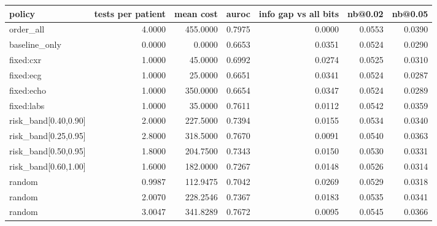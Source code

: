 \begin{tabular}{lrrrrrr}
\toprule
\textbf{policy} & \textbf{tests per patient} & \textbf{mean cost} & \textbf{auroc} & \textbf{info gap vs all bits} & \textbf{nb@0.02} & \textbf{nb@0.05} \\
\midrule
order\_all & 4.0000 & 455.0000 & 0.7975 & 0.0000 & 0.0553 & 0.0390 \\
baseline\_only & 0.0000 & 0.0000 & 0.6653 & 0.0351 & 0.0524 & 0.0290 \\
fixed:cxr & 1.0000 & 45.0000 & 0.6992 & 0.0274 & 0.0525 & 0.0310 \\
fixed:ecg & 1.0000 & 25.0000 & 0.6651 & 0.0341 & 0.0524 & 0.0287 \\
fixed:echo & 1.0000 & 350.0000 & 0.6654 & 0.0347 & 0.0524 & 0.0289 \\
fixed:labs & 1.0000 & 35.0000 & 0.7611 & 0.0112 & 0.0542 & 0.0359 \\
risk\_band[0.40,0.90] & 2.0000 & 227.5000 & 0.7394 & 0.0155 & 0.0534 & 0.0340 \\
risk\_band[0.25,0.95] & 2.8000 & 318.5000 & 0.7670 & 0.0091 & 0.0540 & 0.0363 \\
risk\_band[0.50,0.95] & 1.8000 & 204.7500 & 0.7343 & 0.0150 & 0.0530 & 0.0331 \\
risk\_band[0.60,1.00] & 1.6000 & 182.0000 & 0.7267 & 0.0148 & 0.0526 & 0.0314 \\
random & 0.9987 & 112.9475 & 0.7042 & 0.0269 & 0.0529 & 0.0318 \\
random & 2.0070 & 228.2546 & 0.7367 & 0.0183 & 0.0535 & 0.0341 \\
random & 3.0047 & 341.8289 & 0.7672 & 0.0095 & 0.0545 & 0.0366 \\
\bottomrule
\end{tabular}
